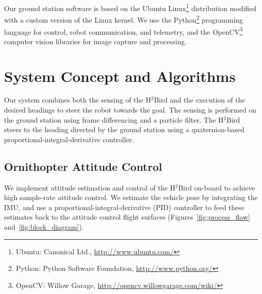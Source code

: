 \documentclass{aamas2013}
\begin{document}
Our ground station software is based on the Ubuntu Linux\footnote{\raggedright Ubuntu: 
Canonical Ltd., \href{http://www.ubuntu.com/}{http://www.ubuntu.com/}} distribution
modified with a custom version of the Linux kernel. 
We use the Python\footnote{\raggedright Python: Python Software Foundation, \href{http://www.python.org/}
{http://www.python.org/}} programming language for control, robot 
communication, and telemetry, and the OpenCV\footnote{\raggedright OpenCV: Willow Garage, 
\href{http://opencv.willowgarage.com/wiki/}{http://opencv.willowgarage.com/wiki/}} 
computer vision libraries for image capture and processing.

\section{System Concept and Algorithms}

Our system combines both the sensing of the H$^2$Bird and the execution of the
desired headings to steer the robot towards the goal. The sensing is performed
on the ground station using frame differencing and a particle filter. The
H$^2$Bird steers to the heading directed by the ground station using a
quaternion-based proportional-integral-derivative controller.

\subsection{Ornithopter Attitude Control}

We implement attitude estimation and control of the H$^2$Bird on-board to 
achieve high sample-rate attitude control. We estimate the vehicle pose by
integrating the IMU, and use a proportional-integral-derivative (PID) 
controller to feed these estimates back to the attitude control flight 
surfaces (Figures~\ref{fig:process_flow} and~\ref{fig:block_diagram}).
\end{document}
